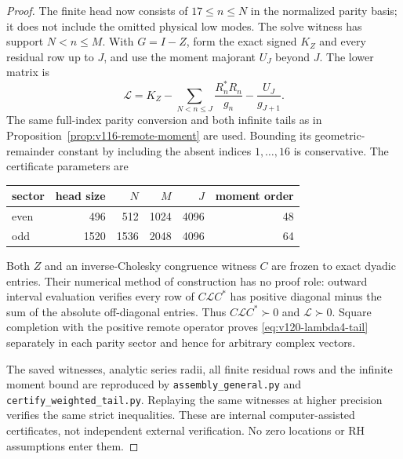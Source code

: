 \documentclass[11pt]{article}
\theoremstyle{remark}
\begin{document}
\begin{proof}
The finite head now consists of $17\le n\le N$ in the normalized
parity basis; it does not include the omitted physical low modes.
The solve witness has support $N<n\le M$. With
$G=I-Z$, form the exact signed $K_Z$ and every residual row up to
$J$, and use the moment majorant $U_J$ beyond $J$. The lower matrix is
\begin{equation}\label{eq:v120-lambda4-lower}
 \mathcal L=K_Z-
  \sum_{N<n\le J}\frac{R_n^*R_n}{g_n}-\frac{U_J}{g_{J+1}}.
\end{equation}
The same full-index parity conversion and both infinite tails as in
Proposition~\ref{prop:v116-remote-moment} are used. Bounding its
geometric-remainder constant by including the absent indices
$1,\ldots,16$ is conservative. The certificate parameters are
\begin{center}
\begin{tabular}{lrrrrr}
\toprule
sector&head size&$N$&$M$&$J$&moment order\\
\midrule
even&496&512&1024&4096&48\\
odd&1520&1536&2048&4096&64\\
\bottomrule
\end{tabular}
\end{center}
Both $Z$ and an inverse-Cholesky congruence witness $C$ are frozen
to exact dyadic entries. Their numerical method of construction has
no proof role: outward interval evaluation verifies every row of
$C\mathcal L C^*$ has positive diagonal minus the sum of the
absolute off-diagonal entries. Thus $C\mathcal L C^*\succ0$
and $\mathcal L\succ0$. Square completion with the positive
remote operator proves \eqref{eq:v120-lambda4-tail} separately
in each parity sector and hence for arbitrary complex vectors.

The saved witnesses, analytic series radii, all finite residual rows
and the infinite moment bound are reproduced by
\texttt{assembly\_general.py} and
\texttt{certify\_weighted\_tail.py}. Replaying the same witnesses
at higher precision verifies the same strict inequalities.
These are internal computer-assisted certificates, not independent
external verification. No zero locations or RH assumptions enter them.
\end{proof}
\end{document}
